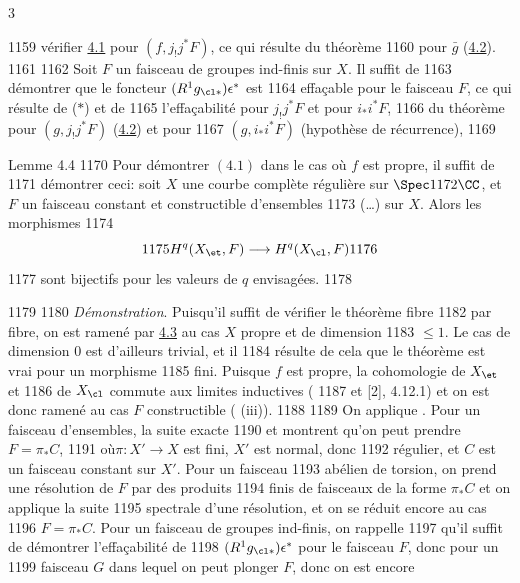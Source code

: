 3	\documentclass[10pt]{../fichiers-configuration-latex/smfart}
\begin{document}
  1159	vérifier \hyperref[XVI.thm4.1]{4.1} pour $(f,j_{!}j^{\ast}F)$, ce qui résulte du théorème
  1160	pour $\bar{g}$ (\hyperref[XVI.lem4.2]{4.2}).
  1161	
  1162	Soit $F$ un faisceau de groupes ind-finis sur $X$. Il suffit de
  1163	démontrer que le foncteur $(R^{1}g_{\cl\ast})\epsilon^{\ast}$ est
  1164	effaçable pour le faisceau $F$, ce qui résulte de ($\ast$) et de
  1165	l'effaçabilité pour $j_{!}j^{\ast}F$ et pour $i_{\ast}i^{\ast}F$,
  1166	\ie du théorème pour $(g,j_{!}j^{\ast}F)$ (\hyperref[XVI.lem4.2]{4.2}) et pour
  1167	$(g,i_{\ast}i^{\ast}F)$ (hypothèse de récurrence), 	
  1169	\begin{enonce*}{Lemme 4.4}
  1170	Pour démontrer $(4.1)$ dans le cas où $f$ est propre, il suffit de
  1171	démontrer ceci: soit $X$ une courbe complète régulière sur $\Spec
  1172	\CC$, et $F$ un faisceau constant et constructible d'ensembles
  1173	(\resp\ldots) sur $X$. Alors les morphismes
  1174	$$
  1175	H^{q}(X_{\et},F)\longrightarrow H^{q}(X_{\cl},F)
  1176	$$
  1177	sont bijectifs pour les valeurs de $q$ envisagées.
  1178	\end{enonce*}
  1179	
  1180		\emph{Démonstration}. Puisqu'il suffit de vérifier le théorème fibre
  1182	par fibre, on est ramené par \hyperref[XVI.lem4.3]{4.3} au cas $X$ propre et de dimension
  1183	$\leq 1$. Le cas de dimension $0$ est d'ailleurs trivial, et il
  1184	résulte de cela que le théorème est vrai pour un morphisme
  1185	fini. Puisque $f$ est propre, la cohomologie de $X_{\et}$ et
  1186	de $X_{\cl}$ commute aux limites inductives (
  1187	et [2], 4.12.1) et on est donc ramené au cas $F$ constructible ( (iii)).
  1188	
  1189	On applique . Pour un faisceau d'ensembles, la suite exacte
  1190	 et  montrent qu'on peut prendre $F=\pi{}_{\ast}C$,
  1191	où\pageoriginale $\pi:X'\rightarrow X$ est fini, $X'$ est normal, donc
  1192	régulier, et $C$ est un faisceau constant sur $X'$. Pour un faisceau
  1193	abélien de torsion, on prend une résolution de $F$ par des produits
  1194	finis de faisceaux de la forme $\pi_{\ast}C$ et on applique la suite
  1195	spectrale d'une résolution, et on se réduit encore au cas
  1196	$F=\pi_{\ast}C$. Pour un faisceau de groupes ind-finis, on rappelle
  1197	qu'il suffit de démontrer l'effaçabilité de
  1198	$(R^{1}g_{\cl\ast})\epsilon^{\ast}$ pour le faisceau $F$, donc pour un
  1199	faisceau $G$ dans lequel on peut plonger $F$, donc on est encore
\end{document}
